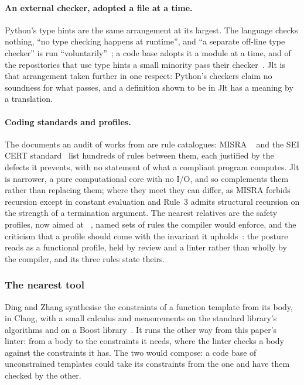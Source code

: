 \paragraph{An external checker, adopted a file at a time.}
Python's type hints are the same arrangement at its largest.
The language checks nothing, ``no type checking happens at runtime'', and ``a separate off-line type checker'' is run ``voluntarily''~\cite{pep484}; a code base adopts it a module at a time, and of the repositories that use type hints a small minority pass their checker~\cite{rakamnouykit2020python}.
Jlt is that arrangement taken further in one respect: Python's checkers claim no soundness for what passes, and a definition shown to be in Jlt has a meaning by a translation.

\paragraph{Coding standards and profiles.}
The documents an audit of \Cpp{} works from are rule catalogues: MISRA \Cpp{}~\cite{misra2023cpp} and the SEI CERT standard~\cite{ballman2016cert} list hundreds of rules between them, each justified by the defects it prevents, with no statement of what a compliant program computes.
Jlt is narrower, a pure computational core with no I/O, and so complements them rather than replacing them; where they meet they can differ, as MISRA forbids recursion except in constant evaluation and Rule~3 admits structural recursion on the strength of a termination argument.
The nearest relatives are the safety profiles, now aimed at ~\cite{sutter2025profiles,sutter2026london}, named sets of rules the compiler would enforce, and the criticism that a profile should come with the invariant it upholds~\cite{muller2025principled}: the posture reads as a functional profile, held by review and a linter rather than wholly by the compiler, and its three rules state theirs.

\subsubsection*{The nearest tool}
Ding and Zhang synthesise the constraints of a \Cpp{} function template from its body, in Clang, with a small calculus and measurements on the standard library's algorithms and on a Boost library~\cite{ding2025constraint}.
It runs the other way from this paper's linter: from a body to the constraints it needs, where the linter checks a body against the constraints it has.
The two would compose: a code base of unconstrained templates could take its constraints from the one and have them checked by the other.
